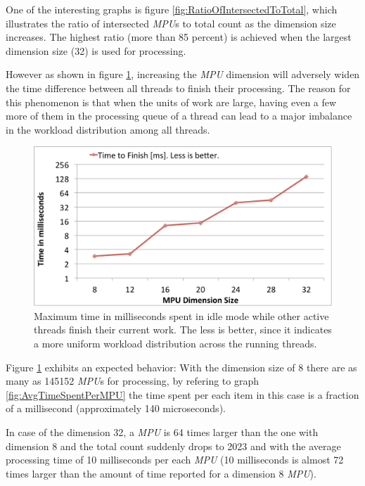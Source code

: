 One of the interesting graphs is figure \ref{fig:RatioOfIntersectedToTotal}, which illustrates the
ratio of intersected \textit{MPU}s to total count as the dimension size increases. The highest
ratio (more than 85 percent) is achieved when the largest dimension size (32) is used for processing.  

However as shown in figure \ref{fig:TimeToFinish}, increasing the \textit{MPU} dimension will adversely widen the
time difference between all threads to finish their processing. The reason for this phenomenon 
is that when the units of work are large, having even a few more of them in the processing 
queue of a thread can lead to a major imbalance in the workload distribution among all threads.

\begin{figure}[H]
  \centering
  \includegraphics[width = 1.0\linewidth]{figures/cpupoly/MpuSizeAnalysis/TimeToFinish.pdf}
  \caption{\label{fig:TimeToFinish}
  {Maximum time in milliseconds spent in idle mode while other active threads finish their current work.
  The less is better, since it indicates a more uniform workload distribution across the running threads.}
}
\end{figure}

Figure \ref{fig:TimeToFinish} exhibits an expected behavior: With the dimension size of 8 there are as many
as 145152 \textit{MPU}s for processing, by refering to graph \ref{fig:AvgTimeSpentPerMPU} the time spent 
per each item in this case is a fraction of a millisecond (approximately 140 microseconds). 

In case of the dimension 32, a \textit{MPU} is 64 times larger than the one with dimension 8 and the total 
count suddenly drops to 2023 and with the average processing time of 10 milliseconds per each 
\textit{MPU} (10 milliseconds is almost 72 times larger than the amount of time reported for a dimension 8 \textit{MPU}). 

